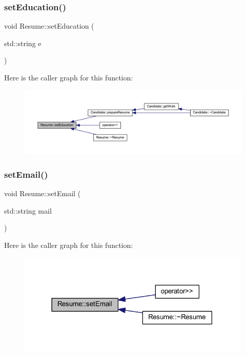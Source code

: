 \subsubsection{\texorpdfstring{set\+Education()}{setEducation()}}
{\footnotesize\ttfamily void Resume\+::set\+Education (\begin{DoxyParamCaption}\item[{std\+::string}]{e }\end{DoxyParamCaption})}

Here is the caller graph for this function\+:
\nopagebreak
\begin{figure}[H]
\begin{center}
\leavevmode
\includegraphics[width=350pt]{class_resume_a9a76b4b2d010ce5259b9be3ff9fca2b6_icgraph}
\end{center}
\end{figure}
\hypertarget{class_resume_a35e1a0db9143d3fcdce851c2156b9060}{}\label{class_resume_a35e1a0db9143d3fcdce851c2156b9060} 
\subsubsection{\texorpdfstring{set\+Email()}{setEmail()}}
{\footnotesize\ttfamily void Resume\+::set\+Email (\begin{DoxyParamCaption}\item[{std\+::string}]{mail }\end{DoxyParamCaption})}

Here is the caller graph for this function\+:
\nopagebreak
\begin{figure}[H]
\begin{center}
\leavevmode
\includegraphics[width=314pt]{class_resume_a35e1a0db9143d3fcdce851c2156b9060_icgraph}
\end{center}
\end{figure}
\hypertarget{class_resume_a3742ddd777e93ad124560cec7da409fa}{}\label{class_resume_a3742ddd777e93ad124560cec7da409fa} 
